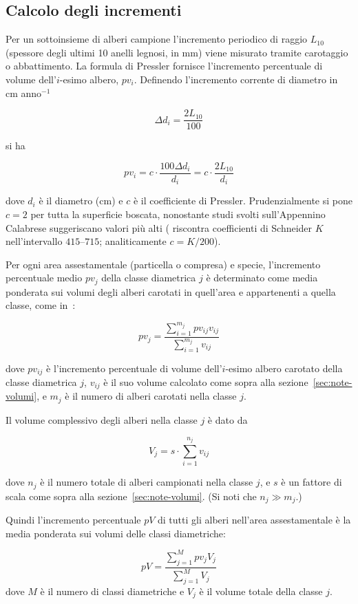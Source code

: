 \documentclass[a4paper,11pt]{article}
\begin{document}
\subsection{Calcolo degli incrementi}

Per un sottoinsieme di alberi campione l'incremento periodico di raggio $L_{10}$ (spessore degli ultimi 10 anelli legnosi, in mm) viene misurato tramite carotaggio o abbattimento. La formula di Pressler fornisce l'incremento percentuale di volume dell'$i$-esimo albero, $pv_i$. Definendo l'incremento corrente di diametro in cm anno$^{-1}$

\[ \Delta d_i = \frac{2L_{10}}{100} \]

si ha

\[ pv_i = c \cdot \frac{100\Delta d_i}{d_i} = c \cdot \frac{2L_{10}}{d_i} \]

dove $d_i$ è il diametro (cm) e $c$ è il coefficiente di Pressler. Prudenzialmente si pone $c = 2$ per tutta la superficie boscata, nonostante studi svolti sull'Appennino Calabrese suggeriscano valori più alti (\cite{marziliano:2011} riscontra coefficienti di Schneider $K$ nell'intervallo $415$--$715$; analiticamente $c = K / 200$).

Per ogni area assestamentale (particella o compresa) e specie, l'incremento percentuale medio $pv_j$ della classe diametrica $j$ è determinato come media ponderata sui volumi degli alberi carotati in quell'area e appartenenti a quella classe, come in~\cite{corona:2007}:

\[ pv_j = \frac{\sum_{i=1}^{m_j} pv_{ij}v_{ij}}{\sum_{i=1}^{m_j} v_{ij}} \]

dove $pv_{ij}$ è l'incremento percentuale di volume dell'$i$-esimo albero carotato della classe diametrica $j$, $v_{ij}$ è il suo volume calcolato come sopra alla sezione~\ref{sec:note-volumi}, e $m_j$ è il numero di alberi carotati nella classe $j$.

Il volume complessivo degli alberi nella classe $j$ è dato da

\[ V_j = s\cdot\sum_{i=1}^{n_j} v_{ij} \]

dove $n_j$ è il numero totale di alberi campionati nella classe $j$, e $s$ è un fattore di scala come sopra alla sezione~\ref{sec:note-volumi}. (Si noti che $n_j \gg m_j$.)

Quindi l'incremento percentuale $pV$ di tutti gli alberi nell'area assestamentale è la media ponderata sui volumi delle classi diametriche:

\begin{equation}
    \label{eq:pV}
    pV = \frac{\sum_{j=1}^{M} pv_jV_j}{\sum_{j=1}^{M} V_j}
\end{equation}
dove $M$ è il numero di classi diametriche e $V_j$ è il volume totale della classe $j$.
\end{document}
